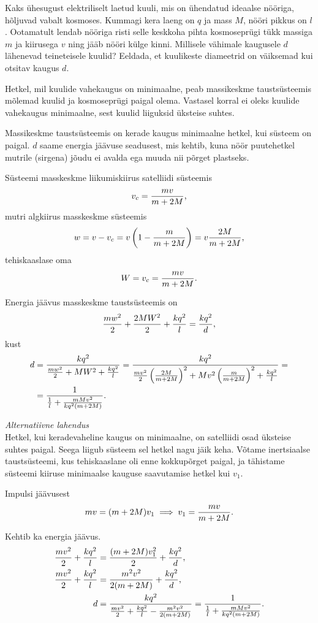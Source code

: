 
Kaks ühesugust elektriliselt laetud
kuuli, mis on ühendatud ideaalse nööriga, hõljuvad vabalt kosmoses. Kummagi
kera laeng on $q$ ja mass $M$, nööri pikkus on $l$.
Ootamatult lendab nööriga risti selle keskkoha pihta kosmoseprügi tükk massiga $m$ ja kiirusega
$v$ ning jääb nööri külge kinni. Millisele vähimale kaugusele $d$ lähenevad teineteisele kuulid?
Eeldada, et kuulikeste diameetrid on väiksemad kui otsitav kaugus $d$.

\hint
Hetkel, mil kuulide vahekaugus on minimaalne, peab massikeskme taustsüsteemis mõlemad kuulid ja kosmoseprügi paigal olema. Vastasel korral ei oleks kuulide vahekaugus minimaalne, sest kuulid liiguksid üksteise suhtes.

\solu
Massikeskme taustsüsteemis on kerade kaugus minimaalne hetkel, kui süsteem on
paigal. $d$ saame energia jäävuse seadusest, mis kehtib, kuna nöör puutehetkel
mutrile (sirgena) jõudu ei avalda ega muuda nii põrget plastseks.

Süsteemi masskeskme liikumiskiirus satelliidi süsteemis
\[ v_c = \frac{m v}{m+2M} \text, \]
mutri algkiirus masskeskme süsteemis
\[ w = v - v_c = v \left(1 - \frac{m}{m+2M}\right) = v \frac{2M}{m+2M} \text, \]
tehiskaaslase oma
\[ W = v_c = \frac{m v}{m+2M} \text. \]

Energia jäävus masskeskme taustsüsteemis on
\[
\frac{m w^2}{2} + \frac{2M W^2}{2} + \frac{k q^2}{l} = \frac{k q^2}{d} \text,
\]
kust
\begin{align*}
d &= \frac{k q^2}{\frac{m w^2}{2} + M W^2 + \frac{k q^2}{l}} =
\frac{k q^2}{\frac{m v^2}{2} \left(\frac{2M}{m+2M}\right)^2 + M v^2
	\left(\frac{m}{m+2M}\right)^2 + \frac{k q^2}{l}} = \\
&= \frac{1}{\frac{1}{l} + \frac{m M v^2}{k q^2 (m+2M)}}
\text.
\end{align*}

\vspace{0.5\baselineskip}

\emph{Alternatiivne lahendus}\\
Hetkel, kui keradevaheline kaugus on minimaalne, on satelliidi osad üksteise
suhtes paigal. Seega liigub süsteem sel hetkel nagu jäik keha. Võtame
inertsiaalse taustsüsteemi, kus tehiskaaslane oli enne kokkupõrget paigal, ja
tähistame süsteemi kiiruse minimaalse kauguse saavutamise hetkel kui $v_1$.

Impulsi jäävusest
\[ m v = (m+2M) v_1 \implies v_1 = \frac{m v}{m+2M}\text. \]

Kehtib ka energia jäävus.
\begin{align*}
\frac{m v^2}{2} + \frac{k q^2}{l} &= \frac{(m+2M) v_1^2}{2} + \frac{k q^2}{d}
\text, \\
\frac{m v^2}{2} + \frac{k q^2}{l} &= \frac{m^2 v^2}{2 (m+2M)} + \frac{k q^2}{d}
\text, \\
d &= \frac{k q^2}{\frac{m v^2}{2} + \frac{k q^2}{l} - \frac{m^2 v^2}{2 (m+2M)}}
= \frac{1}{\frac{1}{l} + \frac{m M v^2}{k q^2 (m+2M)}} \text.
\end{align*}
\probend